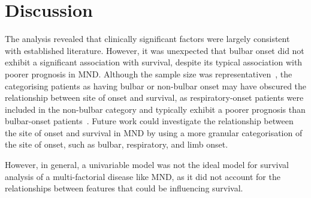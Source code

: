 \section{Discussion}

The analysis revealed that clinically significant factors were largely consistent with established literature.
However, it was unexpected that bulbar onset did not exhibit a significant association with survival, despite its typical association with poorer prognosis in MND.
Although the sample size was representativen~\cite{feldmanAmyotrophicLateralSclerosis2022}, the categorising patients as having bulbar or non-bulbar onset may have obscured the relationship between site of onset and survival, as respiratory-onset patients were included in the non-bulbar category and typically exhibit a poorer prognosis than bulbar-onset patients~\cite{suPredictorsSurvivalPatients2021}.
Future work could investigate the relationship between the site of onset and survival in MND by using a more granular categorisation of the site of onset, such as bulbar, respiratory, and limb onset.

However, in general, a univariable model was not the ideal model for survival analysis of a multi-factorial disease like MND, as it did not account for the relationships between features that could be influencing survival.


